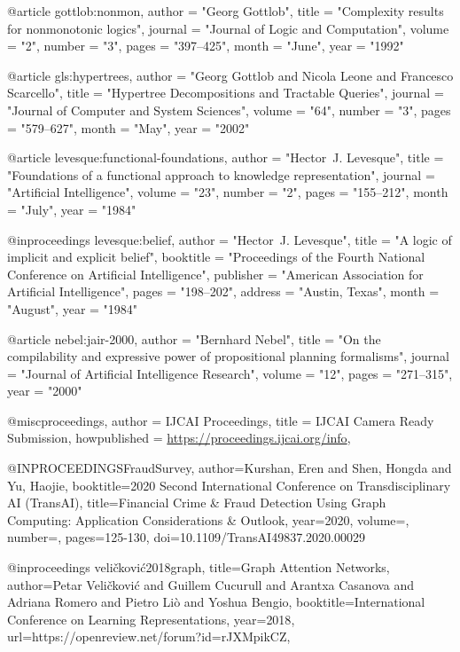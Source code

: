 @article{ gottlob:nonmon,
  author = "Georg Gottlob",
  title = "Complexity results for nonmonotonic logics",
  journal = "Journal of Logic and Computation",
  volume = "2",
  number = "3",
  pages = "397--425",
  month = "June",
  year = "1992"
}

@article{ gls:hypertrees,
  author = "Georg Gottlob and Nicola Leone and Francesco Scarcello",
  title = "Hypertree Decompositions and Tractable Queries",
  journal = "Journal of Computer and System Sciences",
  volume = "64",
  number = "3",
  pages = "579--627",
  month = "May",
  year = "2002"
}

@article{ levesque:functional-foundations,
  author = "Hector~J. Levesque",
  title = "Foundations of a functional approach to knowledge representation",
  journal = "Artificial Intelligence",
  volume = "23",
  number = "2",
  pages = "155--212",
  month = "July",
  year = "1984"
}

@inproceedings{ levesque:belief,
  author = "Hector~J. Levesque",
  title = "A logic of implicit and explicit belief",
  booktitle = "Proceedings of the Fourth National Conference on Artificial Intelligence",
  publisher = "American Association for Artificial Intelligence",
  pages = "198--202",
  address = "Austin, Texas",
  month = "August",
  year = "1984"
}

@article{ nebel:jair-2000,
  author = "Bernhard Nebel",
  title = "On the compilability and expressive power of propositional planning formalisms",
  journal = "Journal of Artificial Intelligence Research",
  volume = "12",
  pages = "271--315",
  year = "2000"
}

 @misc{proceedings,
  author = {{IJCAI Proceedings}},
  title = {{IJCAI} Camera Ready Submission},
  howpublished = {\url{https://proceedings.ijcai.org/info}},
}

@INPROCEEDINGS{FraudSurvey,
  author={Kurshan, Eren and Shen, Hongda and Yu, Haojie},
  booktitle={2020 Second International Conference on Transdisciplinary AI (TransAI)},
  title={Financial Crime \& Fraud Detection Using Graph Computing: Application Considerations \& Outlook},
  year={2020},
  volume={},
  number={},
  pages={125-130},
  doi={10.1109/TransAI49837.2020.00029}}


@inproceedings{
veličković2018graph,
title={Graph Attention Networks},
author={Petar Veličković and Guillem Cucurull and Arantxa Casanova and Adriana Romero and Pietro Liò and Yoshua Bengio},
booktitle={International Conference on Learning Representations},
year={2018},
url={https://openreview.net/forum?id=rJXMpikCZ},
}

